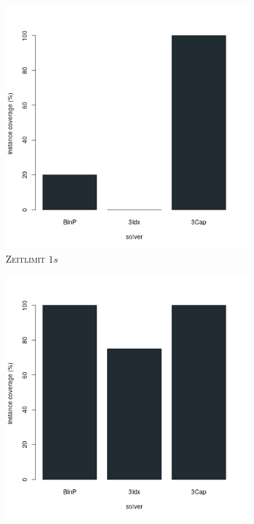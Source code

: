 \begin{figure}[H]
\centering

\begin{subfigure}[b]{0.3\textwidth}
\centering
\includegraphics[width=1.2\textwidth]{img/solver_instance_coverage_b=3_s_1s.png}
\caption{\textsc{Zeitlimit} $1s$}
\label{fig:instance_coverage_b=3_s_a}
\end{subfigure}
\hfill
\begin{subfigure}[b]{0.3\textwidth}
\centering
\includegraphics[width=1.2\textwidth]{img/solver_instance_coverage_b=3_s_3s.png}

\end{subfigure}
\end{figure}
